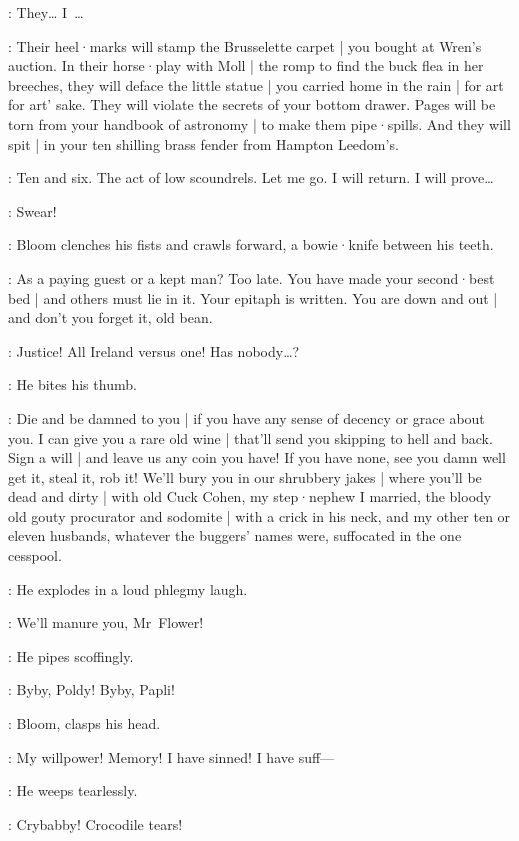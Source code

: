 \Bloom:
They… I~…

\Bello:
Their heel·marks will stamp the Brusselette carpet |
you bought at Wren's auction.
In their horse·play with Moll |
the romp to find the buck flea in her breeches,
they will deface the little statue |
you carried home in the rain |
for art for art' sake.
They will violate the secrets of your bottom drawer.
Pages will be torn from your handbook of astronomy |
to make them pipe·spills.
And they will spit |
in your ten shilling brass fender from Hampton Leedom's.

\Bloom:
Ten and six.
The act of low scoundrels.
Let me go.
I will return.
I will prove…

\Voice:
Swear!

:
Bloom clenches his fists and crawls forward,
a bowie·knife between his teeth.

\Bello:
As a paying guest or a kept man?
Too late.
You have made your second·best bed |
and others must lie in it.
Your epitaph is written.
You are down and out |
and don't you forget it,
old bean.%

\Bloom:
Justice!
All Ireland versus one!
Has nobody…?

:
He bites his thumb.

\Bello:
Die and be damned to you |
if you have any sense of decency or grace about you.
I can give you a rare old wine |
that'll send you skipping to hell and back.
Sign a will |
and leave us any coin you have!
If you have none,
see you damn well get it,
steal it,
rob it!
We'll bury you in our shrubbery jakes |
where you'll be dead and dirty  |
with old Cuck Cohen,
my step·nephew I married,
the bloody old gouty procurator and sodomite |
with a crick in his neck,
and my other ten or eleven husbands,
%
whatever the buggers' names were,
suffocated in the one cesspool.

:
He explodes in a loud phlegmy laugh.

\Bello:
We'll manure you,
Mr~Flower!

:
He pipes scoffingly.

\Bello:
Byby,
Poldy!
Byby,
Papli!

:
Bloom,
clasps his head.

\Bloom:
My willpower!
Memory!
I have sinned!
I have suff---

:
He weeps tearlessly.

\Bello:
Crybabby!
Crocodile tears!


